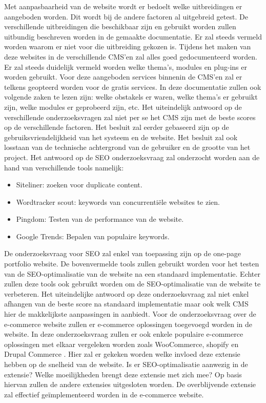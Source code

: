 Met aanpasbaarheid van de website wordt er bedoelt welke uitbreidingen er aangeboden worden. Dit wordt bij de andere factoren al uitgebreid getest. De verschillende uitbreidingen die beschikbaar zijn en gebruikt worden zullen uitbundig beschreven worden in de gemaakte documentatie. Er zal steeds vermeld worden waarom er niet voor die uitbreiding gekozen is.
Tijdens het maken van deze websites in de verschillende CMS'en zal alles goed gedocumenteerd worden. Er zal steeds duidelijk vermeld worden welke thema's, modules en  plug-ins er worden gebruikt. Voor deze aangeboden services binnenin de CMS'en zal er telkens geopteerd worden voor de gratis services. In deze documentatie zullen ook volgende zaken te lezen zijn: welke obstakels er waren, welke thema's er gebruikt zijn, welke modules er geprobeerd zijn, etc.
Het uiteindelijk antwoord op de verschillende onderzoeksvragen zal niet per se het CMS zijn met de beste scores op de verschillende factoren. Het besluit zal eerder gebaseerd zijn op de gebruiksvriendelijkheid van het systeem en de website. Het besluit zal ook losstaan van de technische achtergrond van de gebruiker en de grootte van het project.
Het antwoord op de SEO onderzoeksvraag zal onderzocht worden aan de hand van verschillende tools namelijk:

\begin{itemize}
	\item Siteliner: zoeken voor duplicate content.
	\item Wordtracker scout: keywords van concurrentiële websites te zien.
	\item Pingdom: Testen van de performance van de website.
	\item Google Trends: Bepalen van populaire keywords.
\end{itemize}
De onderzoeksvraag voor SEO zal enkel van toepassing zijn op de one-page portfolio website. De bovenvermelde tools zullen gebruikt worden voor het testen van de SEO-optimalisatie van de website na een standaard implementatie. Echter zullen deze tools ook gebruikt worden om de SEO-optimalisatie van de website te verbeteren. Het uiteindelijke antwoord op deze onderzoeksvraag zal niet enkel afhangen van de beste score na standaard implementatie maar ook welk CMS hier de makkelijkste aanpassingen in aanbiedt.
Voor de onderzoeksvraag over de e-commerce website zullen er e-commerce oplossingen toegevoegd worden in de website. In deze onderzoeksvraag zullen er ook enkele populaire e-commerce oplossingen met elkaar vergeleken worden zoals WooCommerce, shopify en Drupal Commerce \autocite{BWPL2017a}. Hier zal er gekeken worden welke invloed deze extensie hebben op de snelheid van de website. Is er SEO-optimalisatie aanwezig in de extensie? Welke moeilijkheden brengt deze extensie met zich mee? Op basis hiervan zullen de andere extensies uitgesloten worden. De overblijvende extensie zal effectief geïmplementeerd worden in de e-commerce website.

